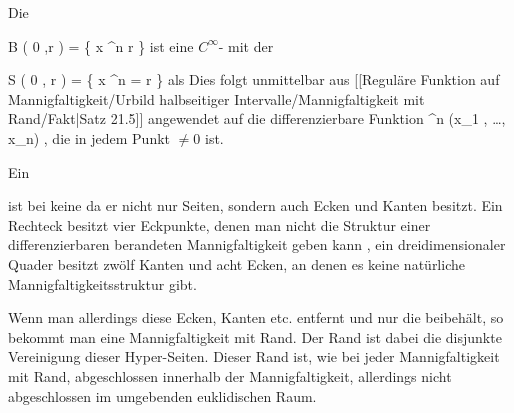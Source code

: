 {

Die

\mavergleichskettedisp
{\vergleichskette
{ B  \left(  0 ,r \right)
}
{ =} { \left\{  x \in \R^n   \mid   {} \leq r         \right\}
}
{ } {
}
{ } {
}
{ } {
}
}
{}{}{}
ist eine
$C^\infty$-
mit der  {}

\mavergleichskettedisp
{\vergleichskette
{ S \left(   0 , r  \right)
}
{ =} { \left\{  x \in \R^n   \mid   {} =  r         \right\}
}
{ } {
}
{ } {
}
{ } {
}
}
{}{}{}
als
Dies folgt unmittelbar aus
[[Reguläre Funktion auf Mannigfaltigkeit/Urbild halbseitiger Intervalle/Mannigfaltigkeit mit Rand/Fakt|Satz 21.5]]
angewendet auf die differenzierbare Funktion
 {\R^n } {\R
} {(x_1 , \ldots , x_n) } { 
} {,}
die in jedem Punkt $\neq 0$
ist.

}

{

Ein
 

 {  }

ist bei
 keine
da er nicht nur Seiten, sondern auch
 {} {}
Ecken und Kanten besitzt. Ein Rechteck besitzt vier Eckpunkte, denen man nicht die Struktur einer
 {} {}
differenzierbaren berandeten Mannigfaltigkeit geben kann
 {} {,}
ein dreidimensionaler Quader besitzt zwölf Kanten und acht Ecken, an denen es keine natürliche Mannigfaltigkeitsstruktur gibt.

Wenn man allerdings diese Ecken, Kanten etc. entfernt und nur die  beibehält, so bekommt man eine
 {} {}
Mannigfaltigkeit mit Rand. Der Rand ist dabei die disjunkte Vereinigung dieser Hyper-Seiten. Dieser Rand ist, wie bei jeder Mannigfaltigkeit mit Rand, abgeschlossen innerhalb der Mannigfaltigkeit, allerdings nicht abgeschlossen im umgebenden euklidischen Raum.

}

